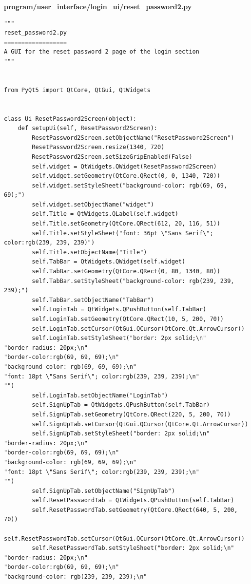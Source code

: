 \documentclass[12pt]{article}
\begin{document}
\textbf{program/user\_interface/login\_ui/reset\_password2.py}
\begin{lstlisting}
"""
reset_password2.py
==================
A GUI for the reset password 2 page of the login section
"""


from PyQt5 import QtCore, QtGui, QtWidgets


class Ui_ResetPassword2Screen(object):
    def setupUi(self, ResetPassword2Screen):
        ResetPassword2Screen.setObjectName("ResetPassword2Screen")
        ResetPassword2Screen.resize(1340, 720)
        ResetPassword2Screen.setSizeGripEnabled(False)
        self.widget = QtWidgets.QWidget(ResetPassword2Screen)
        self.widget.setGeometry(QtCore.QRect(0, 0, 1340, 720))
        self.widget.setStyleSheet("background-color: rgb(69, 69, 69);")
        self.widget.setObjectName("widget")
        self.Title = QtWidgets.QLabel(self.widget)
        self.Title.setGeometry(QtCore.QRect(612, 20, 116, 51))
        self.Title.setStyleSheet("font: 36pt \"Sans Serif\"; color:rgb(239, 239, 239)")
        self.Title.setObjectName("Title")
        self.TabBar = QtWidgets.QWidget(self.widget)
        self.TabBar.setGeometry(QtCore.QRect(0, 80, 1340, 80))
        self.TabBar.setStyleSheet("background-color: rgb(239, 239, 239);")
        self.TabBar.setObjectName("TabBar")
        self.LoginTab = QtWidgets.QPushButton(self.TabBar)
        self.LoginTab.setGeometry(QtCore.QRect(10, 5, 200, 70))
        self.LoginTab.setCursor(QtGui.QCursor(QtCore.Qt.ArrowCursor))
        self.LoginTab.setStyleSheet("border: 2px solid;\n"
"border-radius: 20px;\n"
"border-color:rgb(69, 69, 69);\n"
"background-color: rgb(69, 69, 69);\n"
"font: 18pt \"Sans Serif\"; color:rgb(239, 239, 239);\n"
"")
        self.LoginTab.setObjectName("LoginTab")
        self.SignUpTab = QtWidgets.QPushButton(self.TabBar)
        self.SignUpTab.setGeometry(QtCore.QRect(220, 5, 200, 70))
        self.SignUpTab.setCursor(QtGui.QCursor(QtCore.Qt.ArrowCursor))
        self.SignUpTab.setStyleSheet("border: 2px solid;\n"
"border-radius: 20px;\n"
"border-color:rgb(69, 69, 69);\n"
"background-color: rgb(69, 69, 69);\n"
"font: 18pt \"Sans Serif\"; color:rgb(239, 239, 239);\n"
"")
        self.SignUpTab.setObjectName("SignUpTab")
        self.ResetPasswordTab = QtWidgets.QPushButton(self.TabBar)
        self.ResetPasswordTab.setGeometry(QtCore.QRect(640, 5, 200, 70))
        self.ResetPasswordTab.setCursor(QtGui.QCursor(QtCore.Qt.ArrowCursor))
        self.ResetPasswordTab.setStyleSheet("border: 2px solid;\n"
"border-radius: 20px;\n"
"border-color:rgb(69, 69, 69);\n"
"background-color: rgb(239, 239, 239);\n"

\end{lstlisting}
\end{document}
